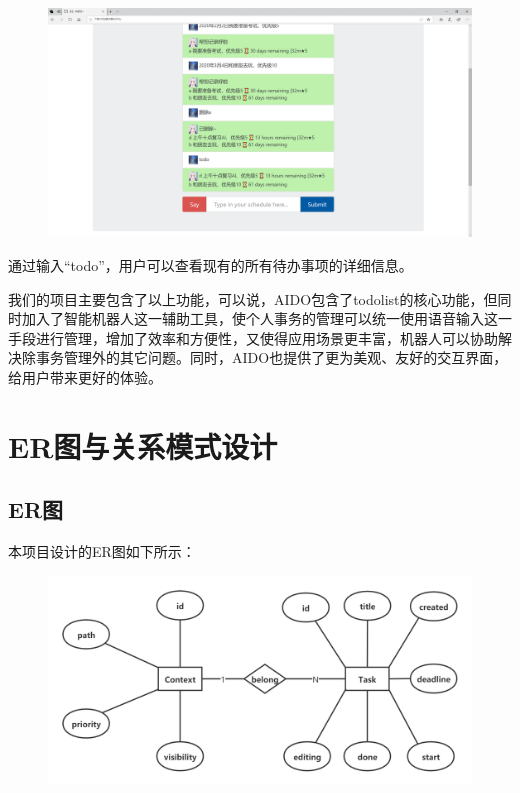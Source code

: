 \documentclass[a4paper, 11pt]{article}
\begin{document}
\begin{itemize}
\begin{figure}[H]
\centering
\includegraphics[width=15cm]{fig/ask_task}
\end{figure}
\par 通过输入“todo”，用户可以查看现有的所有待办事项的详细信息。
\end{itemize}
\par 我们的项目主要包含了以上功能，可以说，AIDO包含了todolist的核心功能，但同时加入了智能机器人这一辅助工具，使个人事务的管理可以统一使用语音输入这一手段进行管理，增加了效率和方便性，又使得应用场景更丰富，机器人可以协助解决除事务管理外的其它问题。同时，AIDO也提供了更为美观、友好的交互界面，给用户带来更好的体验。

\section{ER图与关系模式设计}
\subsection{ER图}
\par 本项目设计的ER图如下所示：
\begin{figure}[H]
\centering
\includegraphics[width=15cm]{fig/er_design}
\end{figure}
\end{document}
